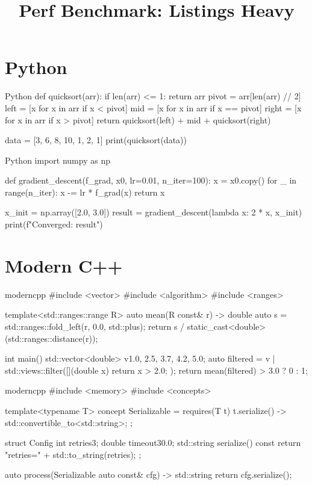 \documentclass[code=listings]{SUSTechHomework}
\title{Perf Benchmark: Listings Heavy}
\begin{document}
\maketitle

\section{Python}

\begin{sustechcode}{Python}
def quicksort(arr):
    if len(arr) <= 1:
        return arr
    pivot = arr[len(arr) // 2]
    left  = [x for x in arr if x < pivot]
    mid   = [x for x in arr if x == pivot]
    right = [x for x in arr if x > pivot]
    return quicksort(left) + mid + quicksort(right)

data = [3, 6, 8, 10, 1, 2, 1]
print(quicksort(data))
\end{sustechcode}

\begin{sustechcode}{Python}
import numpy as np

def gradient_descent(f_grad, x0, lr=0.01, n_iter=100):
    x = x0.copy()
    for _ in range(n_iter):
        x -= lr * f_grad(x)
    return x

x_init = np.array([2.0, 3.0])
result  = gradient_descent(lambda x: 2 * x, x_init)
print(f"Converged: {result}")
\end{sustechcode}

\section{Modern C++}

\begin{sustechcode}{moderncpp}
#include <vector>
#include <algorithm>
#include <ranges>

template<std::ranges::range R>
auto mean(R const& r) -> double {
    auto s = std::ranges::fold_left(r, 0.0, std::plus{});
    return s / static_cast<double>(std::ranges::distance(r));
}

int main() {
    std::vector<double> v{1.0, 2.5, 3.7, 4.2, 5.0};
    auto filtered = v | std::views::filter([](double x){ return x > 2.0; });
    return mean(filtered) > 3.0 ? 0 : 1;
}
\end{sustechcode}

\begin{sustechcode}{moderncpp}
#include <memory>
#include <concepts>

template<typename T>
concept Serializable = requires(T t) {
    { t.serialize() } -> std::convertible_to<std::string>;
};

struct Config {
    int retries{3};
    double timeout{30.0};
    std::string serialize() const {
        return "retries=" + std::to_string(retries);
    }
};

auto process(Serializable auto const& cfg) -> std::string {
    return cfg.serialize();
}
\end{sustechcode}
\end{document}
